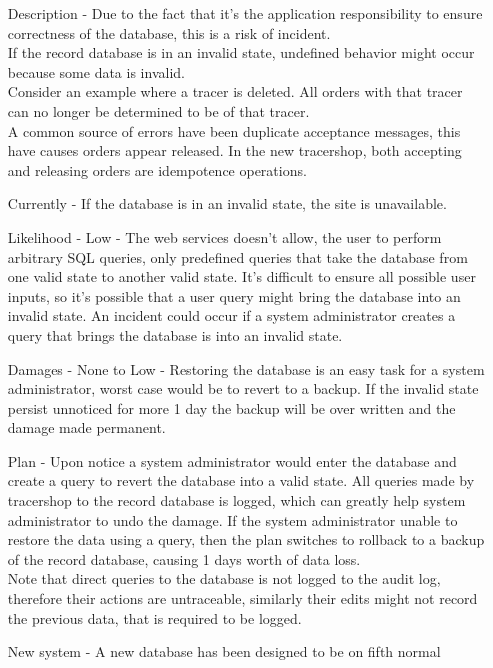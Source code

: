 \documentclass{article}
\begin{document}
\begin{itemize}
\begin{itemize}
    \item[Description] - Due to the fact that it's the application
    responsibility to ensure correctness of the database, this is a risk of
    incident.\\
    If the record database is in an invalid state, undefined behavior might
    occur because some data is invalid.\\
    Consider an example where a tracer is deleted. All orders with that tracer
    can no longer be determined to be of that tracer.\\
    A common source of errors have been duplicate acceptance messages, this have
     causes orders appear released. In the new tracershop, both accepting and
     releasing orders are idempotence operations.
    \item[Currently] - If the database is in an invalid state, the site is
    unavailable.
    \item[Likelihood] - Low - The web services doesn't allow, the user to
    perform arbitrary SQL queries,
    only predefined queries that take the database from one valid state to
    another valid state.
    It's difficult to ensure all possible user inputs, so it's possible that a
    user query might bring the database into an invalid state.
    An incident could occur if a system administrator creates a query that
    brings the database is into an invalid state.
    \item[Damages] - None to Low - Restoring the database is an easy task for a
    system administrator, worst case would be to revert to a backup.
    If the invalid state persist unnoticed for more 1 day the backup will be
    over written and the damage made permanent.
    \item[Plan] - Upon notice a system administrator would enter the database
    and create a query to revert the database into a valid state.
    All queries made by tracershop to the record database is logged, which can
     greatly help system administrator to undo the damage.
    If the system administrator unable to restore the data using a query, then
    the plan switches to rollback to a backup of the record database, causing 1
    days worth of data loss.\\
    Note that direct queries to the database is not logged to the audit log,
    therefore their actions are untraceable, similarly their edits might not
    record the previous data, that is required to be logged.
    \item[New system] - A new database has been designed to be on fifth normal

\end{itemize}
\end{itemize}
\end{document}
